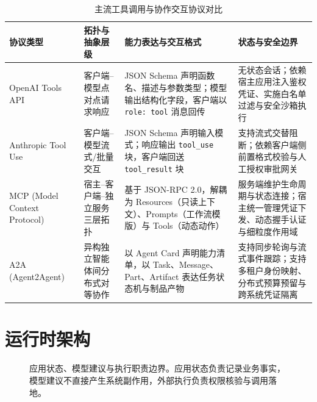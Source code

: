 \documentclass[../textbook.tex]{subfiles}
\begin{document}
\begin{table}[htbp]
\centering
\caption{主流工具调用与协作交互协议对比}
\label{tab:tool-protocols}
\begin{tabularx}{\linewidth}{@{}p{2.2cm}p{2.8cm}p{3.2cm}X@{}}
\toprule
协议类型 & 拓扑与抽象层级 & 能力表达与交互格式 & 状态与安全边界\\
\midrule
OpenAI Tools API & 客户端--模型点对点请求响应 & JSON Schema 声明函数名、描述与参数类型；模型输出结构化字段，客户端以 \texttt{role: tool} 消息回传 & 无状态会话；依赖宿主应用注入鉴权凭证、实施白名单过滤与安全沙箱执行\\
Anthropic Tool Use & 客户端--模型流式/批量交互 & JSON Schema 声明输入模式；响应输出 \texttt{tool\_use} 块，客户端回送 \texttt{tool\_result} 块 & 支持流式交替阻断；依赖客户端侧前置格式校验与人工授权审批网关\\
MCP (Model Context Protocol) & 宿主--客户端--独立服务三层拓扑 & 基于 JSON-RPC 2.0，解耦为 Resources（只读上下文）、Prompts（工作流模版）与 Tools（动态动作） & 服务端维护生命周期与状态连接；宿主统一管理凭证下发、动态握手认证与细粒度作用域\\
A2A (Agent2Agent) & 异构独立智能体间分布式对等协作 & 以 Agent Card 声明能力清单，以 Task、Message、Part、Artifact 表达任务状态机与制品产物 & 支持同步轮询与流式事件跟踪；支持多租户身份映射、分布式预算预留与跨系统凭证隔离\\
\bottomrule
\end{tabularx}
\end{table}

\section{运行时架构}

\begin{figure}[htbp]
\centering
{}
\caption[应用状态、模型建议与执行职责边界]{应用状态、模型建议与执行职责边界。应用状态负责记录业务事实，模型建议不直接产生系统副作用，外部执行负责权限核验与调用落地。}\label{fig:runtime-architecture}
\end{figure}
\end{document}
